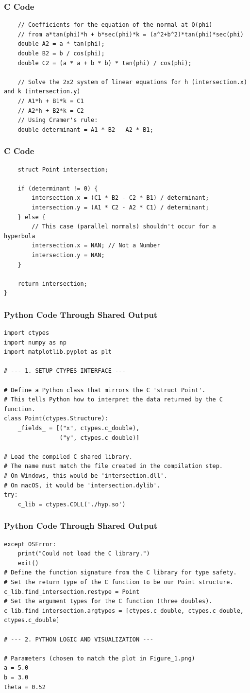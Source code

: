 \documentclass{beamer}
\begin{document}
\begin{frame}[fragile]
\frametitle{C Code}
\begin{lstlisting}
    // Coefficients for the equation of the normal at Q(phi)
    // from a*tan(phi)*h + b*sec(phi)*k = (a^2+b^2)*tan(phi)*sec(phi)
    double A2 = a * tan(phi);
    double B2 = b / cos(phi);
    double C2 = (a * a + b * b) * tan(phi) / cos(phi);

    // Solve the 2x2 system of linear equations for h (intersection.x) and k (intersection.y)
    // A1*h + B1*k = C1
    // A2*h + B2*k = C2
    // Using Cramer's rule:
    double determinant = A1 * B2 - A2 * B1;
 \end{lstlisting}
\end{frame}
\begin{frame}[fragile]
\frametitle{C Code}
\begin{lstlisting}   
    struct Point intersection;

    if (determinant != 0) {
        intersection.x = (C1 * B2 - C2 * B1) / determinant;
        intersection.y = (A1 * C2 - A2 * C1) / determinant;
    } else {
        // This case (parallel normals) shouldn't occur for a hyperbola
        intersection.x = NAN; // Not a Number
        intersection.y = NAN;
    }

    return intersection;
}
\end{lstlisting}
\end{frame}
\begin{frame}[fragile]
\frametitle{Python Code Through Shared Output}
\begin{lstlisting}
import ctypes
import numpy as np
import matplotlib.pyplot as plt

# --- 1. SETUP CTYPES INTERFACE ---

# Define a Python class that mirrors the C 'struct Point'.
# This tells Python how to interpret the data returned by the C function.
class Point(ctypes.Structure):
    _fields_ = [("x", ctypes.c_double),
                ("y", ctypes.c_double)]

# Load the compiled C shared library.
# The name must match the file created in the compilation step.
# On Windows, this would be 'intersection.dll'.
# On macOS, it would be 'intersection.dylib'.
try:
    c_lib = ctypes.CDLL('./hyp.so')
    \end{lstlisting}
\end{frame}
\begin{frame}[fragile]
\frametitle{Python Code Through Shared Output}
\begin{lstlisting}
except OSError:
    print("Could not load the C library.")
    exit()
# Define the function signature from the C library for type safety.
# Set the return type of the C function to be our Point structure.
c_lib.find_intersection.restype = Point
# Set the argument types for the C function (three doubles).
c_lib.find_intersection.argtypes = [ctypes.c_double, ctypes.c_double, ctypes.c_double]

# --- 2. PYTHON LOGIC AND VISUALIZATION ---

# Parameters (chosen to match the plot in Figure_1.png)
a = 5.0
b = 3.0
theta = 0.52
\end{lstlisting}
\end{frame}
\end{document}
